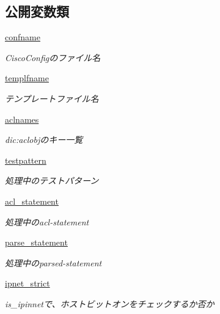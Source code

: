 \subsection*{公開変数類}
\begin{DoxyCompactItemize}
\item 
\mbox{\hyperlink{classCTextFsm_1_1CTextFsm_afaf1b7c90c7fc6173ecc700966132c5c}{confname}}
\begin{DoxyCompactList}\small\item\em Cisco\+Configのファイル名 \end{DoxyCompactList}\item 
\mbox{\label{classCTextFsm_1_1CTextFsm_ad5b28ccc7a1aee160094fde5c304a74b}} 
\mbox{\hyperlink{classCTextFsm_1_1CTextFsm_ad5b28ccc7a1aee160094fde5c304a74b}{templfname}}
\begin{DoxyCompactList}\small\item\em テンプレートファイル名 \end{DoxyCompactList}\item 
\mbox{\hyperlink{classCTextFsm_1_1CTextFsm_ae4a6e9fb950ddd34ce0078bbbce4bb61}{aclnames}}
\begin{DoxyCompactList}\small\item\em dic\+:aclobjのキー一覧 \end{DoxyCompactList}\item 
\mbox{\hyperlink{classCTextFsm_1_1CTextFsm_a821e94401ea692f24c0ee2f64d7a0a04}{testpattern}}
\begin{DoxyCompactList}\small\item\em 処理中のテストパターン \end{DoxyCompactList}\item 
\mbox{\label{classCTextFsm_1_1CTextFsm_a4056398c8eeffd96560aad7265eb1dee}} 
\mbox{\hyperlink{classCTextFsm_1_1CTextFsm_a4056398c8eeffd96560aad7265eb1dee}{acl\+\_\+statement}}
\begin{DoxyCompactList}\small\item\em 処理中のacl-\/statement \end{DoxyCompactList}\item 
\mbox{\hyperlink{classCTextFsm_1_1CTextFsm_a1e3f702dc6832495689001245994913a}{parse\+\_\+statement}}
\begin{DoxyCompactList}\small\item\em 処理中のparsed-\/statement \end{DoxyCompactList}\item 
\mbox{\label{classCTextFsm_1_1CTextFsm_a40438368fa1a2fd8858d2960713caeff}} 
\mbox{\hyperlink{classCTextFsm_1_1CTextFsm_a40438368fa1a2fd8858d2960713caeff}{ipnet\+\_\+strict}}
\begin{DoxyCompactList}\small\item\em is\+\_\+ipinnetで、ホストビットオンをチェックするか否か \end{DoxyCompactList}\end{DoxyCompactItemize}
